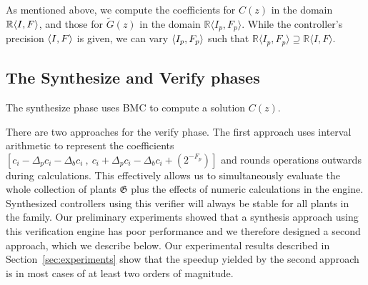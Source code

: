 \documentclass[final]{sig-alternate-05-2015}
\begin{document}
As mentioned above, we compute the coefficients for $C(z)$ 
in the domain $\mathbb{R}\langle{I},{F}\rangle$, 
and those for $\tilde G(z)$ in the domain
$\mathbb{R}\langle I_p,F_p \rangle$.
While the controller's precision $\langle{I},{F}\rangle$ is given, 
we can vary $\langle{I_p},{F_p}\rangle$ such that 
$\mathbb{R}\langle I_p,F_p \rangle \supseteq \mathbb{R}\langle I,F \rangle$.

\subsection{The {\sc Synthesize} and {\sc Verify} phases}

The {\sc synthesize} phase uses BMC to 
compute a solution $C(z)$. %

There are two approaches for the {\sc verify} phase.
The first approach uses interval arithmetic \cite{moore1966interval}
to represent the coefficients
$[{c}_i-\Delta_p{c}_i-\Delta_b{c}_i\ ,\
{c}_i+\Delta_p{c}_i-\Delta_b{c}_i+(2^{-F_p})]$ 
and rounds operations outwards during calculations.  This effectively allows
us to simultaneously evaluate the whole collection of plants $\mathfrak{G}$
plus the effects of numeric calculations in the engine.  Synthesized
controllers using this verifier will always be stable for all plants in the
family.
Our preliminary experiments showed that a synthesis approach
using this verification engine has poor performance and we
therefore designed a second approach, which we describe below.
Our experimental results described in Section~\ref{sec:experiments}
show that the speedup yielded by the second approach 
is in most cases of at least two orders of magnitude.
\end{document}
